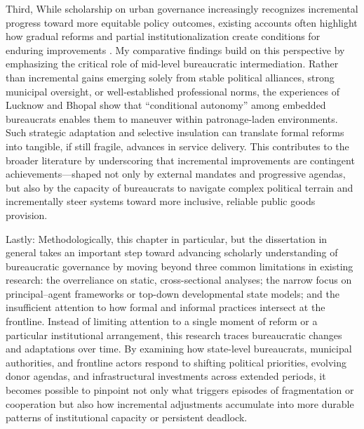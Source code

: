 Third, While scholarship on urban governance increasingly recognizes incremental progress toward more equitable policy outcomes, existing accounts often highlight how gradual reforms and partial institutionalization create conditions for enduring improvements \citep{eduardo_politics_2021}. My comparative findings build on this perspective by emphasizing the critical role of mid-level bureaucratic intermediation. Rather than incremental gains emerging solely from stable political alliances, strong municipal oversight, or well-established professional norms, the experiences of Lucknow and Bhopal show that “conditional autonomy” among embedded bureaucrats enables them to maneuver within patronage-laden environments. Such strategic adaptation and selective insulation can translate formal reforms into tangible, if still fragile, advances in service delivery. This contributes to the broader literature by underscoring that incremental improvements are contingent achievements—shaped not only by external mandates and progressive agendas, but also by the capacity of bureaucrats to navigate complex political terrain and incrementally steer systems toward more inclusive, reliable public goods provision.

Lastly: Methodologically, this chapter in particular, but the dissertation in general takes an important step toward advancing scholarly understanding of bureaucratic governance by moving beyond three common limitations in existing research: the overreliance on static, cross-sectional analyses; the narrow focus on principal–agent frameworks or top-down developmental state models; and the insufficient attention to how formal and informal practices intersect at the frontline.\citep{pepinsky_bureaucracy_2017} Instead of limiting attention to a single moment of reform or a particular institutional arrangement, this research traces bureaucratic changes and adaptations over time. By examining how state-level bureaucrats, municipal authorities, and frontline actors respond to shifting political priorities, evolving donor agendas, and infrastructural investments across extended periods, it becomes possible to pinpoint not only what triggers episodes of fragmentation or cooperation but also how incremental adjustments accumulate into more durable patterns of institutional capacity or persistent deadlock.

